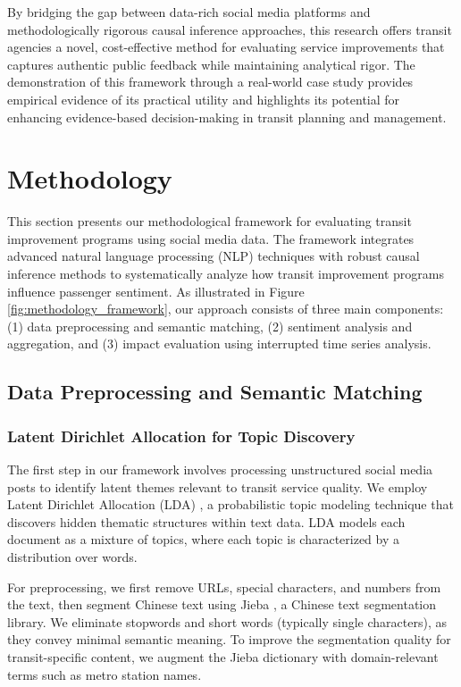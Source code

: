 \documentclass[a4paper,fleqn,12pt]{cas-sc}
\begin{document}
By bridging the gap between data-rich social media platforms and methodologically rigorous causal inference approaches, this research offers transit agencies a novel, cost-effective method for evaluating service improvements that captures authentic public feedback while maintaining analytical rigor. The demonstration of this framework through a real-world case study provides empirical evidence of its practical utility and highlights its potential for enhancing evidence-based decision-making in transit planning and management.

\section{Methodology}\label{sec:Methodology}

This section presents our methodological framework for evaluating transit improvement programs using social media data. The framework integrates advanced natural language processing (NLP) techniques with robust causal inference methods to systematically analyze how transit improvement programs influence passenger sentiment. As illustrated in Figure \ref{fig:methodology_framework}, our approach consists of three main components: (1) data preprocessing and semantic matching, (2) sentiment analysis and aggregation, and (3) impact evaluation using interrupted time series analysis.

\subsection{Data Preprocessing and Semantic Matching}

\subsubsection{Latent Dirichlet Allocation for Topic Discovery}

The first step in our framework involves processing unstructured social media posts to identify latent themes relevant to transit service quality. We employ Latent Dirichlet Allocation (LDA) \citep{blei2003latent}, a probabilistic topic modeling technique that discovers hidden thematic structures within text data. LDA models each document as a mixture of topics, where each topic is characterized by a distribution over words.

For preprocessing, we first remove URLs, special characters, and numbers from the text, then segment Chinese text using Jieba \citep{sun2012jieba}, a Chinese text segmentation library. We eliminate stopwords and short words (typically single characters), as they convey minimal semantic meaning. To improve the segmentation quality for transit-specific content, we augment the Jieba dictionary with domain-relevant terms such as metro station names.
\end{document}
